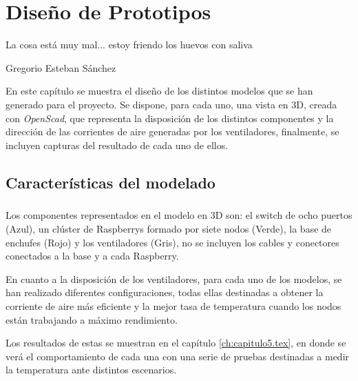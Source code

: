 \newpage
\chapter{Diseño de Prototipos}
\label{ch:capitulo4.tex}

\begin{FraseCelebre}

\begin{Frase}
		La cosa está muy mal... estoy friendo los huevos con saliva
	\end{Frase}
    
	\begin{Fuente}
	Gregorio Esteban Sánchez
	\end{Fuente}

\end{FraseCelebre}


En este capítulo se muestra el diseño de los distintos modelos que se han generado para el proyecto. Se dispone, para cada uno, una vista en 3D, creada con \textit{OpenScad}, que representa la disposición de los distintos componentes y la dirección de las corrientes de aire generadas por los ventiladores, finalmente, se incluyen capturas del resultado de cada uno de ellos.

\section{Características del modelado}
\label{makereference4.2}
\paragraph{}

Los componentes representados en el modelo en 3D son: el switch de ocho puertos (\textcolor[rgb]{0.16,0.3,0.67}{Azul}), un clúster de Raspberrys formado por siete nodos (\textcolor[rgb]{0.1,0.57,0.2}{Verde}), la base de enchufes (\textcolor[rgb]{0.71,0.28,0.25}{Rojo}) y los ventiladores (\textcolor[rgb]{0.58,0.58,0.58}{Gris}), no se incluyen los cables y conectores conectados a la base y a cada Raspberry.

En cuanto a la disposición de los ventiladores, para cada uno de los modelos, se han realizado diferentes configuraciones, todas ellas destinadas a obtener la corriente de aire más eficiente y la mejor tasa de temperatura cuando los nodos están trabajando a máximo rendimiento. 

Los resultados de estas se muestran en el capítulo \ref{ch:capitulo5.tex}, en donde se verá el comportamiento de cada una con una serie de pruebas destinadas a medir la temperatura ante distintos escenarios.

